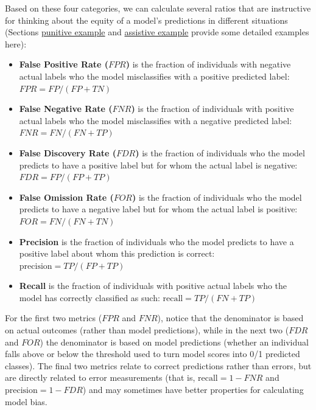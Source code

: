 \documentclass[]{krantz}
\begin{document}
Based on these four categories, we can calculate several ratios that are
instructive for thinking about the equity of a model's predictions in
different situations (Sections
\protect\hyperlink{sec:punitiveexample}{punitive example} and
\protect\hyperlink{sec:assistiveexample}{assistive example} provide some
detailed examples here):

\begin{itemize}
\item
  \textbf{False Positive Rate (\(FPR\))} is the fraction of individuals
  with negative actual labels who the model misclassifies with a
  positive predicted label: \(FPR = FP / (FP+TN)\)
\item
  \textbf{False Negative Rate (\(FNR\))} is the fraction of individuals
  with positive actual labels who the model misclassifies with a
  negative predicted label: \(FNR = FN / (FN+TP)\)
\item
  \textbf{False Discovery Rate (\(FDR\))} is the fraction of individuals
  who the model predicts to have a positive label but for whom the
  actual label is negative: \(FDR = FP / (FP+TP)\)
\item
  \textbf{False Omission Rate (\(FOR\))} is the fraction of individuals
  who the model predicts to have a negative label but for whom the
  actual label is positive: \(FOR = FN / (FN+TN)\)
\item
  \textbf{Precision} is the fraction of individuals who the model
  predicts to have a positive label about whom this prediction is
  correct: \(\textrm{precision} = TP / (FP+TP)\)
\item
  \textbf{Recall} is the fraction of individuals with positive actual
  labels who the model has correctly classified as such:
  \(\textrm{recall} = TP / (FN+TP)\)
\end{itemize}

For the first two metrics (\(FPR\) and \(FNR\)), notice that the
denominator is based on actual outcomes (rather than model predictions),
while in the next two (\(FDR\) and \(FOR\)) the denominator is based on
model predictions (whether an individual falls above or below the
threshold used to turn model scores into 0/1 predicted classes). The
final two metrics relate to correct predictions rather than errors, but
are directly related to error measurements (that is,
\(\textrm{recall} = 1-FNR\) and \(\textrm{precision} = 1-FDR\)) and may
sometimes have better properties for calculating model bias.
\end{document}
